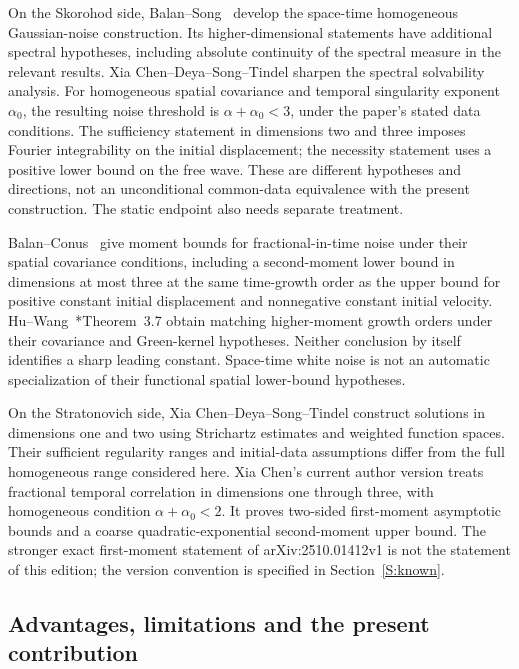 On the Skorohod side, Balan--Song~\cite{balan.song:17:hyperbolic} develop the
space-time homogeneous Gaussian-noise construction. Its higher-dimensional
statements have additional spectral hypotheses, including absolute continuity
of the spectral measure in the relevant results. Xia Chen--Deya--Song--Tindel
\cite{chen.deya.ea:25:solving} sharpen the spectral solvability analysis. For
homogeneous spatial covariance and temporal singularity exponent $\alpha_0$,
the resulting noise threshold is $\alpha + \alpha_0 < 3$, under the paper's
stated data conditions. The sufficiency statement in dimensions two and three
imposes Fourier integrability on the initial displacement; the necessity
statement uses a positive lower bound on the free wave. These are different
hypotheses and directions, not an unconditional common-data equivalence with
the present construction. The static endpoint also needs separate treatment.

Balan--Conus~\cite{balan.conus:16:intermittency} give moment bounds for
fractional-in-time noise under their spatial covariance conditions, including
a second-moment lower bound in dimensions at most three at the same time-growth
order as the upper bound for positive constant initial displacement and
nonnegative constant initial velocity. Hu--Wang~\cite{hu.wang:24:matching}*{Theorem~3.7}
obtain matching higher-moment growth orders under their covariance and
Green-kernel hypotheses. Neither conclusion by itself identifies a sharp
leading constant. Space-time white noise is not an automatic specialization
of their functional spatial lower-bound hypotheses.

On the Stratonovich side, Xia Chen--Deya--Song--Tindel
\cite{chen.deya.ea:23:hyperbolic} construct solutions in dimensions one and two
using Strichartz estimates and weighted function spaces. Their sufficient
regularity ranges and initial-data assumptions differ from the full
homogeneous range considered here. Xia Chen's current author version
\cite{chen:author2026:time-dependency} treats fractional temporal correlation
in dimensions one through three, with homogeneous condition
$\alpha + \alpha_0 < 2$. It proves two-sided first-moment asymptotic bounds and
a coarse quadratic-exponential second-moment upper bound. The stronger exact
first-moment statement of arXiv:2510.01412v1 is not the statement of this
edition; the version convention is specified in Section~\ref{S:known}.



\subsection{Advantages, limitations and the present contribution}

